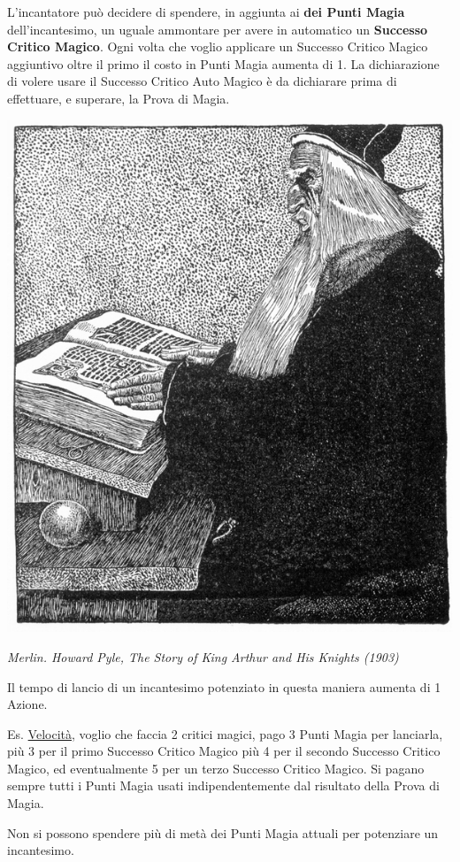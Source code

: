 \begin{multicols}{2}
L'incantatore può decidere di spendere, in aggiunta ai \textbf{dei Punti Magia} dell'incantesimo, un uguale ammontare per avere in automatico un \textbf{Successo Critico Magico}.
Ogni volta che voglio applicare un Successo Critico Magico aggiuntivo oltre il primo il costo in Punti Magia aumenta di 1. La dichiarazione di volere usare il Successo Critico Auto Magico è da dichiarare prima di effettuare, e superare, la Prova di Magia.


\medskip

\begin{center}
	\includegraphics[width=0.7\linewidth]{immagini/Arthur-Pyle_The_Enchanter_Merlin.png}

	\emph{Merlin. Howard Pyle, The Story of King Arthur and His Knights (1903)}
\end{center}

Il tempo di lancio di un incantesimo potenziato in questa maniera aumenta di 1 Azione.

Es. \hyperlink{Velocità}{Velocità}, voglio che faccia 2 critici magici, pago 3 Punti Magia per lanciarla, più 3 per il primo Successo Critico Magico più 4 per il secondo Successo Critico Magico, ed eventualmente 5 per un terzo Successo Critico Magico. Si pagano sempre tutti i Punti Magia usati indipendentemente dal risultato della Prova di Magia.

Non si possono spendere più di metà dei Punti Magia attuali per potenziare un incantesimo.


\end{multicols}
